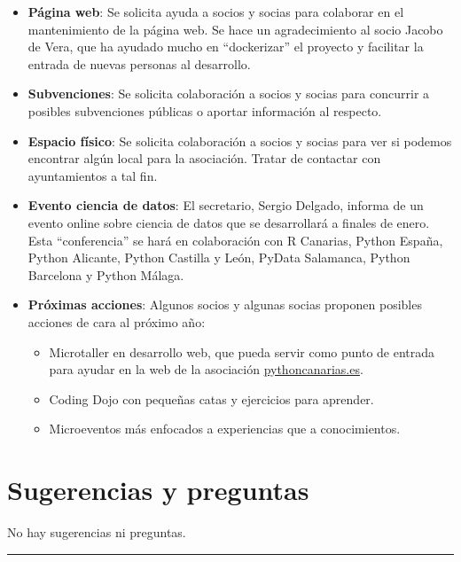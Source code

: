 \documentclass[a4paper, 12pt]{article}
\begin{document}
\begin{itemize}
    \item \textbf{Página web}: Se solicita ayuda a socios y socias para colaborar en el mantenimiento de la página web. Se hace un agradecimiento al socio Jacobo de Vera, que ha ayudado mucho en ``dockerizar'' el proyecto y facilitar la entrada de nuevas personas al desarrollo.
    \item \textbf{Subvenciones}: Se solicita colaboración a socios y socias para concurrir a posibles subvenciones públicas o aportar información al respecto.
    \item \textbf{Espacio físico}: Se solicita colaboración a socios y socias para ver si podemos encontrar algún local para la asociación. Tratar de contactar con ayuntamientos a tal fin.
    \item \textbf{Evento ciencia de datos}: El secretario, Sergio Delgado, informa de un evento online sobre ciencia de datos que se desarrollará a finales de enero. Esta ``conferencia'' se hará en colaboración con R Canarias, Python España, Python Alicante, Python Castilla y León, PyData Salamanca, Python Barcelona y Python Málaga.
    \item \textbf{Próximas acciones}: Algunos socios y algunas socias proponen posibles acciones de cara al próximo año:
    \begin{itemize}
        \item Microtaller en desarrollo web, que pueda servir como punto de entrada para ayudar en la web de la asociación \href{https://pythoncanarias.es}{pythoncanarias.es}.
        \item Coding Dojo con pequeñas catas y ejercicios para aprender.
        \item Microeventos más enfocados a experiencias que a conocimientos.
    \end{itemize}
\end{itemize}

\section{Sugerencias y preguntas}

No hay sugerencias ni preguntas.


\vspace{1cm}
\hrule
\vspace{3mm}
\end{document}
